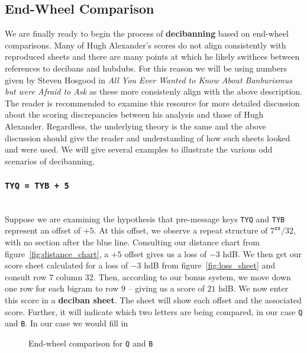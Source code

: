 \subsection{End-Wheel Comparison}
We are finally ready to begin the process of {\bf{decibanning}}
based on end-wheel comparisons. Many of Hugh Alexander's scores do
not align consistently with reproduced sheets and there are many
points at which he likely swithces between references to decibans
and hubdubs. For this reason we will be using numbers given by
Steven Hosgood in \emph{All You Ever Wanted to Know About
	Banburismus but were Afraid to Ask} as these more consistenly align
with the above description. The reader is recommended to examine
this resource for more detailed discussion about the scoring
discrepancies between his analysis and those of Hugh Alexander.
Regardless, the underlying theory is the same and the above
discussion should give the reader and understanding of how such
sheets looked and were used. We will give several examples to
illustrate the various odd scenarios of decibanning.
\subsubsection{\texttt{TYQ = TYB + 5}}
\text{}\\Suppose we are examining the hypothesis that pre-message
keys \texttt{TYQ} and \texttt{TYB} represent an offset of $+5$. At
this offset, we observe a repeat structure of $7^\texttt{xx}/32$,
with no section after the blue line. Consulting our distance chart
from figure~\ref{fig:distance_chart}, a $+5$ offset gives us a loss
of $-3$ hdB. We then get our score sheet calculated for a loss of
$-3$ hdB from figure~\ref{fig:loss_sheet} and consult row $7$
column $32$. Then, according to our bonus system, we move down one
row for each bigram to row $9$ -- giving us a score of $21$ hdB. We
now enter this score in a  {\bf{deciban sheet}}. The sheet will
show each offset and the associated score. Further, it will
indicate which two letters are being compared, in our case
\texttt{Q} and \texttt{B}. In our case we would fill in

\begin{figure}[H]
	\begin{center}
	\end{center}
	\caption{End-wheel comparison for \texttt{Q} and \texttt{B}}
\end{figure}

